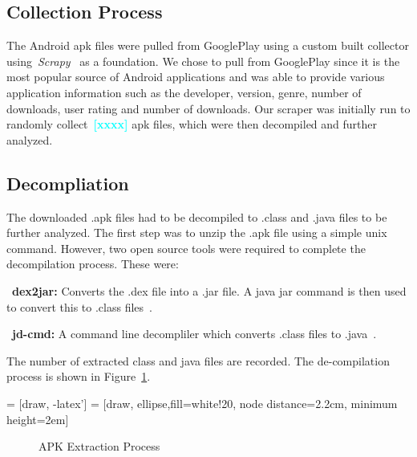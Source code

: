 \documentclass{sig-alternate}
\newcommand{\todo}[1]{\textcolor{cyan}{\textbf{[#1]}}}
\begin{document}
\label{sec: collection}
\subsection{Collection Process}

The Android apk files were pulled from GooglePlay using a custom built collector using~\emph{Scrapy}~\cite{scrapy_URL} as a foundation. We chose to pull from GooglePlay since it is the most popular source of Android applications and was able to provide various application information such as the developer, version, genre, number of downloads, user rating and number of downloads. Our scraper was initially run to randomly collect~\todo{xxxx} apk files, which were then decompiled and further analyzed. 

\subsection{Decompliation}
\label{sec: decompliation}

The downloaded .apk files had to be decompiled to .class and .java files to be further analyzed. The first step was to unzip the .apk file using a simple unix command. However, two open source tools were required to complete the decompilation process. These were:
 \begin{description}
    \item~\textbf{dex2jar:} Converts the .dex file into a .jar file. A java jar command is then used to convert this to .class files~\cite{dex2jar_key}.
    \item~\textbf{jd-cmd:} A command line decompliler which converts .class files to .java~\cite{jdcmd_key}.
\end{description}

The number of extracted class and java files are recorded. The de-compilation process is shown in Figure~\ref{fig:extractionprocess}.

\begin{center}



 = [draw, -latex']
 = [draw, ellipse,fill=white!20, node distance=2.2cm,
    minimum height=2em]
\begin{figure}[h]
\caption{APK Extraction Process}
\label{fig:extractionprocess}
\end{figure}
\end{center}
\end{document}
